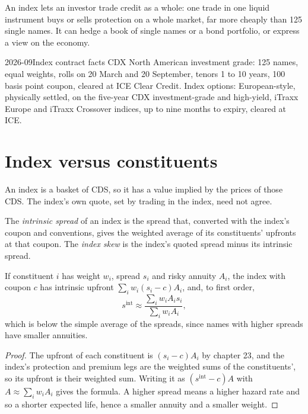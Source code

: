 An index lets an investor trade credit as a whole: one trade in one liquid
instrument buys or sells protection on a whole market, far more cheaply than 125
single names. It can hedge a book of single names or a bond portfolio, or express a
view on the economy.

\begin{dated}{2026-09}{Index contract facts}\label{dat:m2:credit-indices-and-tranches:indices}
CDX North American investment grade: 125 names, equal weights, rolls on 20 March and
20 September, tenors 1 to 10 years, 100 basis point coupon, cleared at ICE Clear
Credit. Index options: European-style, physically settled, on the five-year CDX
investment-grade and high-yield, iTraxx Europe and iTraxx Crossover indices, up to
nine months to expiry, cleared at ICE.
\end{dated}

\section{Index versus constituents}

An index is a basket of CDS, so it has a value implied by the prices of those CDS.
The index's own quote, set by trading in the index, need not agree.

\begin{definition}\label{def:m2:credit-indices-and-tranches:intrinsic}
The \emph{intrinsic spread} of an index is the spread that,
converted with the index's coupon and conventions, gives the weighted average of its
constituents' upfronts at that coupon. The \emph{index skew} is the
index's quoted spread minus its intrinsic spread.
\end{definition}

\begin{proposition}\label{prop:m2:credit-indices-and-tranches:intrinsic}
If constituent $i$ has weight $w_i$, spread $s_i$ and risky annuity $A_i$, the index
with coupon $c$ has intrinsic upfront $\sum_i w_i (s_i - c) A_i$, and, to first
order, 
\[
s^{\text{int}} \approx \frac{\sum_i w_i A_i s_i}{\sum_i w_i A_i},
\]
which is below the simple average of the spreads, since names with higher spreads have
smaller annuities.
\end{proposition}

\begin{proof}
The upfront of each constituent is $(s_i - c)A_i$ by chapter 23, and the index's
protection and premium legs are the weighted sums of the constituents', so its
upfront is their weighted sum. Writing it as $(s^{\text{int}} - c)A$ with $A \approx
\sum_i w_i A_i$ gives the formula. A higher spread means a higher hazard rate and so
a shorter expected life, hence a smaller annuity and a smaller weight.
\end{proof}

